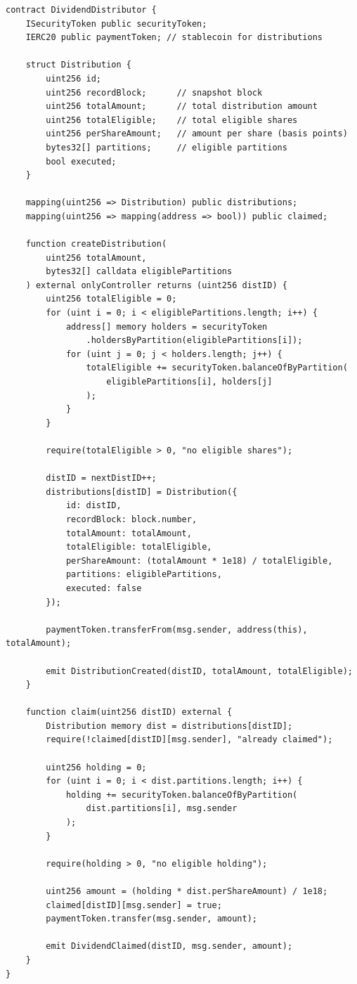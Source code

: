 \documentclass[11pt,a4paper]{article}
\begin{document}
\begin{lstlisting}[language=Solidity,caption={Dividend distribution contract.}]
contract DividendDistributor {
    ISecurityToken public securityToken;
    IERC20 public paymentToken; // stablecoin for distributions

    struct Distribution {
        uint256 id;
        uint256 recordBlock;      // snapshot block
        uint256 totalAmount;      // total distribution amount
        uint256 totalEligible;    // total eligible shares
        uint256 perShareAmount;   // amount per share (basis points)
        bytes32[] partitions;     // eligible partitions
        bool executed;
    }

    mapping(uint256 => Distribution) public distributions;
    mapping(uint256 => mapping(address => bool)) public claimed;

    function createDistribution(
        uint256 totalAmount,
        bytes32[] calldata eligiblePartitions
    ) external onlyController returns (uint256 distID) {
        uint256 totalEligible = 0;
        for (uint i = 0; i < eligiblePartitions.length; i++) {
            address[] memory holders = securityToken
                .holdersByPartition(eligiblePartitions[i]);
            for (uint j = 0; j < holders.length; j++) {
                totalEligible += securityToken.balanceOfByPartition(
                    eligiblePartitions[i], holders[j]
                );
            }
        }

        require(totalEligible > 0, "no eligible shares");

        distID = nextDistID++;
        distributions[distID] = Distribution({
            id: distID,
            recordBlock: block.number,
            totalAmount: totalAmount,
            totalEligible: totalEligible,
            perShareAmount: (totalAmount * 1e18) / totalEligible,
            partitions: eligiblePartitions,
            executed: false
        });

        paymentToken.transferFrom(msg.sender, address(this), totalAmount);

        emit DistributionCreated(distID, totalAmount, totalEligible);
    }

    function claim(uint256 distID) external {
        Distribution memory dist = distributions[distID];
        require(!claimed[distID][msg.sender], "already claimed");

        uint256 holding = 0;
        for (uint i = 0; i < dist.partitions.length; i++) {
            holding += securityToken.balanceOfByPartition(
                dist.partitions[i], msg.sender
            );
        }

        require(holding > 0, "no eligible holding");

        uint256 amount = (holding * dist.perShareAmount) / 1e18;
        claimed[distID][msg.sender] = true;
        paymentToken.transfer(msg.sender, amount);

        emit DividendClaimed(distID, msg.sender, amount);
    }
}
\end{lstlisting}
\end{document}
